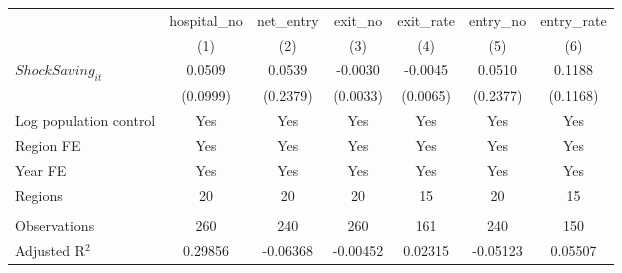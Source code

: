 \begingroup
\centering
\begin{tabular}{lcccccc}
   \toprule
                          & hospital\_no  & net\_entry  & exit\_no  & exit\_rate  & entry\_no  & entry\_rate \\    
                          & (1)           & (2)         & (3)       & (4)         & (5)        & (6)\\  
   \midrule 
   $ShockSaving_{it}$     & 0.0509        & 0.0539      & -0.0030   & -0.0045     & 0.0510     & 0.1188\\   
                          & (0.0999)      & (0.2379)    & (0.0033)  & (0.0065)    & (0.2377)   & (0.1168)\\   
   Log population control & Yes           & Yes         & Yes       & Yes         & Yes        & Yes\\  
   Region FE              & Yes           & Yes         & Yes       & Yes         & Yes        & Yes\\  
   Year FE                & Yes           & Yes         & Yes       & Yes         & Yes        & Yes\\  
   Regions                & 20            & 20          & 20        & 15          & 20         & 15\\  
    \\
   Observations           & 260           & 240         & 260       & 161         & 240        & 150\\  
   Adjusted R$^2$         & 0.29856       & -0.06368    & -0.00452  & 0.02315     & -0.05123   & 0.05507\\  
   \bottomrule
\end{tabular}
\par\endgroup
